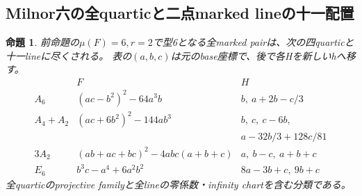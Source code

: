 \documentclass[a4paper,11pt]{ltjsarticle}
\newtheorem{proposition}{命題}[section]
\theoremstyle{definition}
\begin{document}
\subsection{Milnor六の全quarticと二点marked lineの十一配置}
\begin{proposition}\label{prop:marked-quartic-mu6-whole-list}
前命題の$\mu(F)=6,r=2$で型6となる全marked pairは、次の四quarticと十一lineに尽くされる。
表の$(a,b,c)$は元のbase座標で、後で各Hを新しいhへ移す。
\[
\begin{array}{c|l|l}
 &F&H\\\hline
 A_6&(ac-b^2)^2-64a^3b&b,\ a+2b-c/3\\
 A_4+A_2&(ac+6b^2)^2-144ab^3&b,\ c,\ c-6b,\\
 &&a-32b/3+128c/81\\
 3A_2&(ab+ac+bc)^2-4abc(a+b+c)&a,\ b-c,\ a+b+c\\
 E_6&b^3c-a^4+6a^2b^2&8a-3b+c,\ 9b+c
\end{array}
\]
全quarticのprojective familyと全lineの零係数・infinity chartを含む分類である。
\end{proposition}
\end{document}

